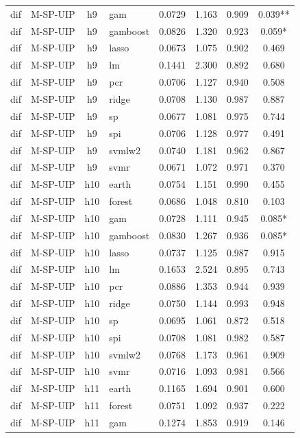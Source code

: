 \begin{ThreePartTable}
\begin{longtable}[t]{llclcccc}
dif & M-SP-UIP & h9 & gam & 0.0729 & 1.163 & 0.909 & 0.039**\\
dif & M-SP-UIP & h9 & gamboost & 0.0826 & 1.320 & 0.923 & 0.059*\\
dif & M-SP-UIP & h9 & lasso & 0.0673 & 1.075 & 0.902 & 0.469\\
dif & M-SP-UIP & h9 & lm & 0.1441 & 2.300 & 0.892 & 0.680\\
dif & M-SP-UIP & h9 & pcr & 0.0706 & 1.127 & 0.940 & 0.508\\
dif & M-SP-UIP & h9 & ridge & 0.0708 & 1.130 & 0.987 & 0.887\\
dif & M-SP-UIP & h9 & sp & 0.0677 & 1.081 & 0.975 & 0.744\\
dif & M-SP-UIP & h9 & spi & 0.0706 & 1.128 & 0.977 & 0.491\\
dif & M-SP-UIP & h9 & svmlw2 & 0.0740 & 1.181 & 0.962 & 0.867\\
dif & M-SP-UIP & h9 & svmr & 0.0671 & 1.072 & 0.971 & 0.370\\
\addlinespace
dif & M-SP-UIP & h10 & earth & 0.0754 & 1.151 & 0.990 & 0.455\\
dif & M-SP-UIP & h10 & forest & 0.0686 & 1.048 & 0.810 & 0.103\\
dif & M-SP-UIP & h10 & gam & 0.0728 & 1.111 & 0.945 & 0.085*\\
dif & M-SP-UIP & h10 & gamboost & 0.0830 & 1.267 & 0.936 & 0.085*\\
dif & M-SP-UIP & h10 & lasso & 0.0737 & 1.125 & 0.987 & 0.915\\
dif & M-SP-UIP & h10 & lm & 0.1653 & 2.524 & 0.895 & 0.743\\
dif & M-SP-UIP & h10 & pcr & 0.0886 & 1.353 & 0.944 & 0.939\\
dif & M-SP-UIP & h10 & ridge & 0.0750 & 1.144 & 0.993 & 0.948\\
dif & M-SP-UIP & h10 & sp & 0.0695 & 1.061 & 0.872 & 0.518\\
dif & M-SP-UIP & h10 & spi & 0.0708 & 1.081 & 0.982 & 0.587\\
dif & M-SP-UIP & h10 & svmlw2 & 0.0768 & 1.173 & 0.961 & 0.909\\
dif & M-SP-UIP & h10 & svmr & 0.0716 & 1.093 & 0.981 & 0.566\\
\addlinespace
dif & M-SP-UIP & h11 & earth & 0.1165 & 1.694 & 0.901 & 0.600\\
dif & M-SP-UIP & h11 & forest & 0.0751 & 1.092 & 0.937 & 0.222\\
dif & M-SP-UIP & h11 & gam & 0.1274 & 1.853 & 0.919 & 0.146\\

\end{longtable}
\end{ThreePartTable}
